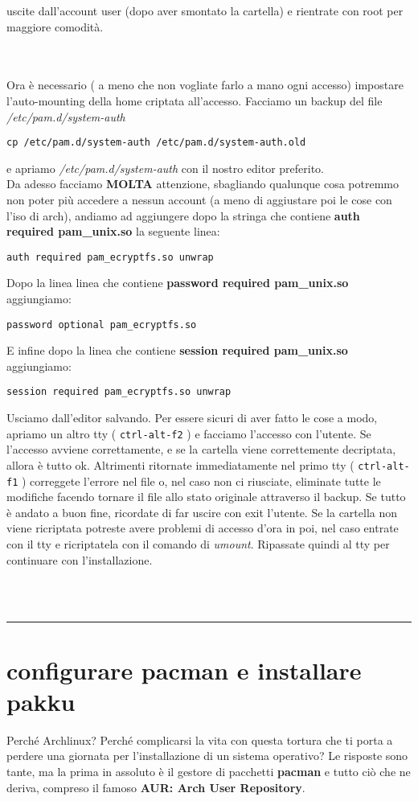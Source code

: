 \documentclass[twoside,italian]{book}
\newcommand{\nlinea}{
	\leavevmode
	\\
}
\newcommand{\centcode}[1]{
	
	\definecolor{centcode}{rgb}{0.5,0.1,0.1}
	
	\begin{center}
	 	\texttt{\textcolor{centcode}{#1}}
	\end{center}
	
	
}
\newcommand{\code}[1]{
	\texttt{\textcolor{code}{#1}}
}
\begin{document}
			uscite dall'account user (dopo aver smontato la cartella) e rientrate con root per maggiore comodità.
			\nlinea
			\nlinea
			Ora è necessario ( a meno che non vogliate farlo a mano ogni accesso) impostare l'auto-mounting della home criptata all'accesso.
			Facciamo un backup del file \textit{/etc/pam.d/system-auth} \centcode{cp /etc/pam.d/system-auth /etc/pam.d/system-auth.old}e apriamo \textit{/etc/pam.d/system-auth} con il nostro editor preferito.\\
			Da adesso facciamo \textbf{MOLTA} attenzione, sbagliando qualunque cosa potremmo non poter più accedere a nessun account (a meno di aggiustare poi le cose con l'iso di arch), andiamo ad aggiungere dopo la stringa che contiene \textbf{auth required pam\_unix.so} la seguente linea:
			\centcode{auth    required    pam\_ecryptfs.so unwrap}

			Dopo la linea linea che contiene \textbf{password required pam\_unix.so} aggiungiamo: \centcode{password    optional    pam\_ecryptfs.so}

			E infine dopo la linea che contiene \textbf{session required pam\_unix.so} aggiungiamo:\centcode{session required pam\_ecryptfs.so unwrap}
			Usciamo dall'editor salvando. Per essere sicuri di aver fatto le cose a modo, apriamo un altro tty (\code{ctrl-alt-f2}) e facciamo l'accesso con l'utente. Se l'accesso avviene correttamente, e se la cartella viene correttemente decriptata, allora è tutto ok. Altrimenti ritornate immediatamente nel primo tty (\code{ctrl-alt-f1})  correggete l'errore nel file o, nel caso non ci riusciate, eliminate tutte le modifiche facendo tornare il file allo stato originale attraverso il backup.
			Se tutto è andato a buon fine, ricordate di far uscire con exit l'utente. Se la cartella non viene ricriptata potreste avere problemi di accesso d'ora in poi, nel caso entrate con il tty e ricriptatela con il comando di \textit{umount}.
			Ripassate quindi al tty per continuare con l'installazione.




			\nlinea

			\nlinea

			\hrule


		\section{configurare pacman e installare pakku }

			Perché Archlinux? Perché complicarsi la vita con questa tortura che ti porta a perdere una giornata per l'installazione di un sistema operativo? Le risposte sono tante, ma la prima in assoluto è il gestore di pacchetti \textbf{pacman} e tutto ciò che ne deriva, compreso il famoso \textbf{AUR: Arch User Repository}.
\end{document}
